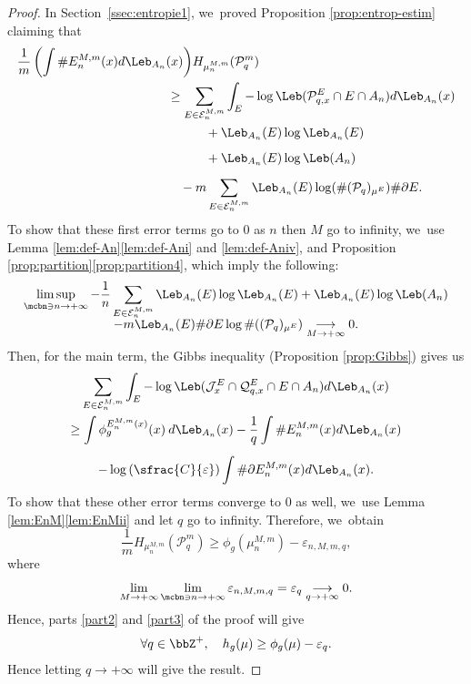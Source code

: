 \begin{proof}
In Section~\ref{ssec:entropie1}, we~proved Proposition \ref{prop:entrop-estim} claiming that
\begin{align*}
\frac{1}{m} \left (\int \# E_n^{M,m}(x) d \Leb_{A_n}(x) \right) &H_{\mu_n^{M,m}}(\mathcal{P}_q^m)\\
&\hspace{-2em}\geq \sum_{E \in \mathcal{E}_n^{M,m}} \int_E - \log \Leb(\mathcal{P}_{q,x}^E \cap E \cap A_n) d \Leb_{A_n}(x)\\
&\hspace{1em}+ \Leb_{A_n}(E) \log \Leb_{A_n}(E)\\[0.5em]
&\hspace{1em}+ \Leb_{A_n}(E) \log \Leb(A_n)\\[0.5em]
&\hspace{-1em}- m \sum_{E \in \mathcal{E}_n^{M,m}} \Leb_{A_n}(E) \log (\# (\mathcal{P}_q)_{\mu^E}) \# \partial E.
\end{align*}
To show that these first error terms go to $0$ as $n$ then $M$ go to infinity, we~use Lemma \ref{lem:def-An}\eqref{lem:def-Ani} and \eqref{lem:def-Aniv}, and Proposition \ref{prop:partition}\eqref{prop:partition4}, which imply the following:\vspace{-5pt}
\begin{multline*}
\limsup_{\mcbn \ni n \to +\infty}-\frac{1}{n}\sum_{E \in \mathcal{E}_n^{M,m}} \Leb_{A_n}(E) \log \Leb_{A_n}(E) + \Leb_{A_n}(E) \log \Leb(A_n)\\[-5pt]
-m \Leb_{A_n}(E) \# \partial E \log \# ((\mathcal{P}_q)_{\mu^E}) \underset{M \to +\infty}{\longrightarrow} 0.
\end{multline*}
Then, for the main term, the Gibbs inequality (Proposition \ref{prop:Gibbs}) gives us
\begin{multline*}
\sum_{E \in \mathcal{E}_n^{M,m}} \int_E - \log \Leb(\mathcal{J}^E_x \cap \mathcal{Q}_{q,x}^E \cap E \cap A_n) d \Leb_{A_n}(x)\\
\geq \int \phi_g^{E_n^{M,m}(x)}(x) \: d \Leb_{A_n}(x) - \frac{1}{q} \int \# E_n^{M,m}(x) d \Leb_{A_n}(x)\\[0.5em]
- \log \left (\sfrac{C}{\varepsilon} \right) \int \# \partial E_n^{M,m}(x) d \Leb_{A_n}(x).
\end{multline*}
To show that these other error terms converge to $0$ as well, we~use Lemma \ref{lem:EnM}\eqref{lem:EnMii} and let $q$ go to infinity. Therefore, we~obtain
\[
\frac{1}{m} H_{\mu_n^{M,m}}(\mathcal{P}_q^m)
\geq \phi_g(\mu_n^{M,m}) - \varepsilon_{n,M,m,q},
\]
where
\[
\lim_{M \to +\infty} \lim_{\mcbn \ni n \to +\infty}\varepsilon_{n,M,m,q} = \varepsilon_q \underset{q \to +\infty}{\longrightarrow} 0.
\]
Hence, parts \ref{part2} and \ref{part3} of the proof will give
\[
\forall q \in \bbZ^+,\quad h_g(\mu) \geq \phi_g(\mu) - \varepsilon_q.
\]
Hence letting $q \to +\infty$ will give the result.


\end{proof}

